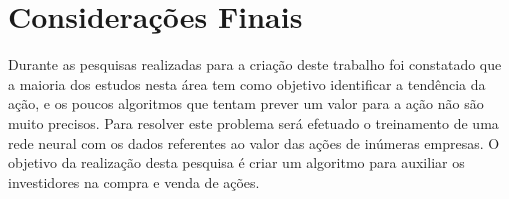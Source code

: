 \chapter{Considerações Finais}
Durante as pesquisas realizadas para a criação deste trabalho foi constatado que a maioria dos estudos nesta área tem como objetivo identificar a tendência da ação, e os poucos algoritmos que tentam prever um valor para a ação não são muito precisos. Para resolver este problema será efetuado o treinamento de uma rede neural com os dados referentes ao valor das ações de inúmeras empresas. O objetivo da realização desta pesquisa é criar um algoritmo para auxiliar os investidores na compra e venda de ações.